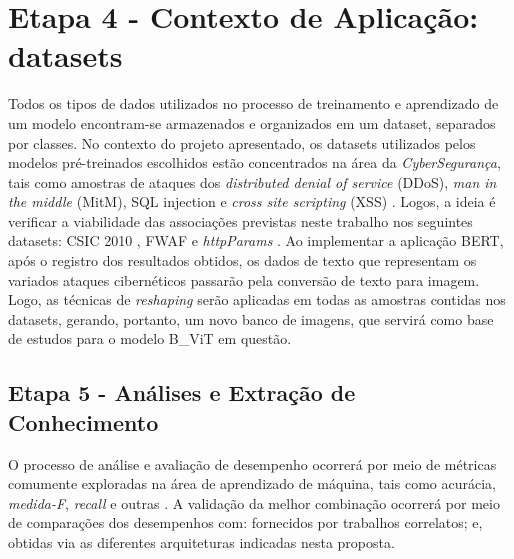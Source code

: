 \section{Etapa 4 - Contexto de Aplicação: datasets}
Todos os tipos de dados utilizados no processo de treinamento e aprendizado de um modelo encontram-se armazenados e organizados em um dataset, separados por classes. No contexto do projeto apresentado, os datasets utilizados pelos modelos pré-treinados escolhidos estão concentrados na área da \textit{CyberSegurança}, tais como amostras de ataques dos \textit{distributed denial of service} (DDoS), \textit{man in the middle} (MitM), SQL injection e \textit{cross site scripting} (XSS) \cite{luxemburk2021detection}. Logos, a ideia é verificar a viabilidade das associações previstas neste trabalho nos seguintes datasets: CSIC 2010 \cite{gimenez2010http}, FWAF \cite{ahmad2017web} e \textit{httpParams} \cite{morzeux2020httpparams}. Ao implementar a aplicação BERT, após o registro dos resultados obtidos, os dados de texto que representam os variados ataques cibernéticos passarão pela conversão de texto para imagem. Logo, as técnicas de \textit{reshaping} serão aplicadas em todas as amostras contidas nos datasets, gerando, portanto, um novo banco de imagens, que servirá como base de estudos para o modelo B\_ViT em questão.

\subsection{Etapa 5 - Análises e Extração de Conhecimento}

O processo de análise e avaliação de desempenho ocorrerá por meio de métricas comumente exploradas na área de aprendizado de máquina, tais como acurácia, \textit{medida-F}, \textit{recall} e outras \cite{duda2012pattern}. A validação da melhor combinação ocorrerá por meio de comparações dos desempenhos com: fornecidos por trabalhos correlatos; e, obtidas via as diferentes arquiteturas indicadas nesta proposta.
